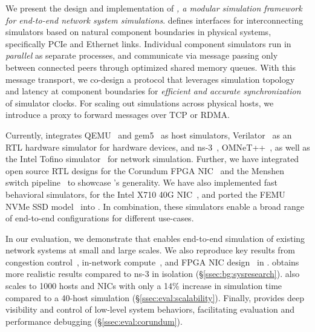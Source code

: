 We present the design and implementation of \emph{\sysname, a modular
simulation framework for end-to-end network system simulations}.
%
\sysname defines interfaces for interconnecting simulators based on
natural component boundaries in physical systems, specifically
PCIe and Ethernet links.
%
Individual component simulators run in \emph{parallel} as separate processes,
and communicate via message passing only between connected peers through
optimized shared memory queues.
%
With this message transport, we co-design a protocol that leverages
simulation topology and latency at component boundaries for
\emph{efficient and accurate synchronization} of simulator clocks.
%
For scaling out simulations across physical hosts, we introduce
a proxy to forward messages over TCP or RDMA.

Currently, \sysname integrates QEMU~\cite{software:qemu} and
gem5~\cite{binkert:gem5} as host simulators,
Verilator~\cite{software:verilator} as an RTL hardware simulator for
hardware devices,
and ns-3~\cite{software:ns3}, OMNeT++~\cite{varga:omnetpp}, as well
as the Intel Tofino simulator~\cite{software:p4studio} for
network simulation.
%
Further, we have integrated open source RTL designs for the Corundum
FPGA NIC~\cite{forencich:corundum} and the
Menshen switch pipeline~\cite{wang:menshen} to showcase \sysname{}'s
generality.
%
We have also implemented fast behavioral simulators, \eg for
the Intel X710 40G NIC~\cite{spec:intel_x710}, and ported the
FEMU NVMe SSD model~\cite{li:femu} into \sysname.
%
In combination, these simulators enable a broad range of end-to-end
configurations for different use-cases.

In our evaluation, we demonstrate that \sysname enables end-to-end simulation of
existing network systems at small and large scales.
%
We also reproduce key results from congestion
control~\cite{alizadeh:dctcp},
in-network compute~\cite{li:nopaxos},
and FPGA NIC design~\cite{forencich:corundum} in \sysname.
%
\sysname obtains more realistic results compared to ns-3 in isolation
(\S\ref{ssec:bg:sysresearch}).
%
\sysname also scales to 1000 hosts and NICs with only a
14\% increase in simulation time compared to a 40-host simulation
(\S\ref{ssec:eval:scalability}).
%
Finally, \sysname provides deep visibility and control of low-level system
behaviors, facilitating evaluation and performance debugging
(\S\ref{ssec:eval:corundum}).

